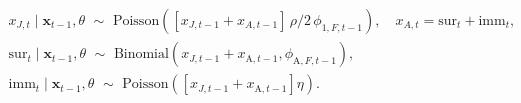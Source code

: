 \begin{gather}
    x_{J, t} \mid \mathbf{x}_{t - 1}, \theta 
    \,\, \sim \,\,
    \text{Poisson}\left(
      \left[x_{J, t - 1} + x_{A, t - 1}\right]
      \, \rho / 2 \,
      \phi_{1, F, t - 1} 
    \right),
    \quad 
    x_{A, t} = \text{sur}_{t} + \text{imm}_{t}, \\
    \text{sur}_{t} \mid \mathbf{x}_{t - 1}, \theta
    \,\, \sim \,\,
    \text{Binomial}\left(
      x_{J, t - 1} + x_{\mathrm{A}, t - 1},
      \phi_{\mathrm{A}, F, t - 1}
    \right), \\
    \text{imm}_{t} \mid \mathbf{x}_{t - 1}, \theta 
    \,\, \sim\,\,
    \text{Poisson}\left(
      \left[x_{J, t - 1} + x_{\mathrm{A}, t - 1}\right] \eta\right
    ).
  \label{eqn:count-data-submodel}
\end{gather}